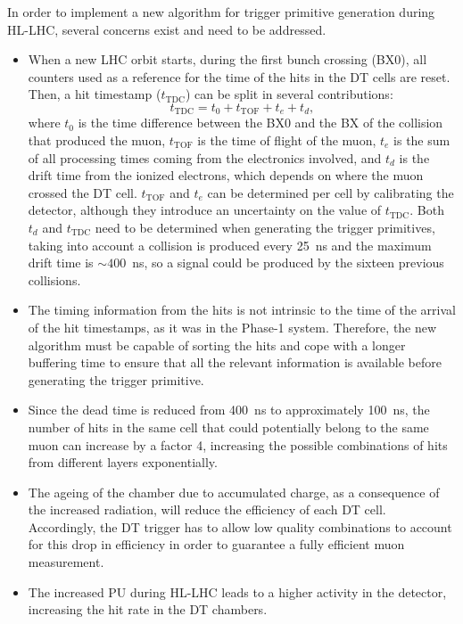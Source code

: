\documentclass[../main.tex]{subfiles}
\begin{document}
In order to implement a new algorithm for trigger primitive generation during HL-LHC, several concerns exist and need to be addressed.
\begin{itemize}
	\item When a new LHC orbit starts, during the first bunch crossing (BX0), all counters used as a reference for the time of the hits in the DT cells are reset. Then, a hit timestamp ($t_{\text{TDC}}$) can be split in several contributions:
	\begin{equation}
		t_{\text{TDC}} = t_0 + t_{\text{TOF}} + t_e + t_d,
	\end{equation}
	where $t_0$ is the time difference between the BX0 and the BX of the collision that produced the muon, $t_{\text{TOF}}$ is the time of flight of the muon, $t_e$ is the sum of all processing times coming from the electronics involved, and $t_d$ is the drift time from the ionized electrons, which depends on where the muon crossed the DT cell. $t_{\text{TOF}}$ and $t_e$ can be determined per cell by calibrating the detector, although they introduce an uncertainty on the value of $t_{\text{TDC}}$. Both $t_d$ and $t_{\text{TDC}}$ need to be determined when generating the trigger primitives, taking into account a collision is produced every 25~ns and the maximum drift time is $\sim400$~ns, so a signal could be produced by the sixteen previous collisions.
	\item The timing information from the hits is not intrinsic to the time of the arrival of the hit timestamps, as it was in the Phase-1 system. Therefore, the new algorithm must be capable of sorting the hits and cope with a longer buffering time to ensure that all the relevant information is available before generating the trigger primitive.
	\item Since the dead time is reduced from 400~ns to approximately 100~ns, the number of hits in the same cell that could potentially belong to the same muon can increase by a factor 4, increasing the possible combinations of hits from different layers exponentially.
	\item The ageing of the chamber due to accumulated charge, as a consequence of the increased radiation, will reduce the efficiency of each DT cell. Accordingly, the DT trigger has to allow low quality combinations to account for this drop in efficiency in order to guarantee a fully efficient muon measurement.
	\item The increased PU during HL-LHC leads to a higher activity in the detector, increasing the hit rate in the DT chambers.
\end{itemize}
\end{document}
